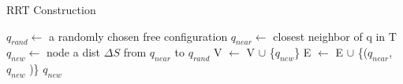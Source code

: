 \label{RRT}
\begin{algorithm}
  \caption{RRT Construction}
  \begin{algorithmic}[1]

  \renewcommand{\algorithmicrequire}{\textbf{Input:} }
  \renewcommand{\algorithmicensure}{\textbf{Output:} }
  \REQUIRE 
     \linebreak
     \linebreak

  \ENSURE  \linebreak
     \linebreak

  \hrulefill 

  \STATE {}
  \STATE {}

  \STATE $q_{rand} \leftarrow$ a randomly chosen free configuration
  \STATE $q_{near} \leftarrow$ closest neighbor of q in T
  \STATE $q_{new} \leftarrow$ node a dist $\Delta S$ from $q_{near}$ to $q_{rand}$
      \STATE V $\leftarrow$ V $\cup$ \{$q_{new}$\}
      \STATE E $\leftarrow$ E $\cup$ \{($q_{near}$, $q_{new}$ )\}
      \RETURN $q_{new}$
    \ENDIF
  \ENDFOR

  \end{algorithmic} 
  \end{algorithm}